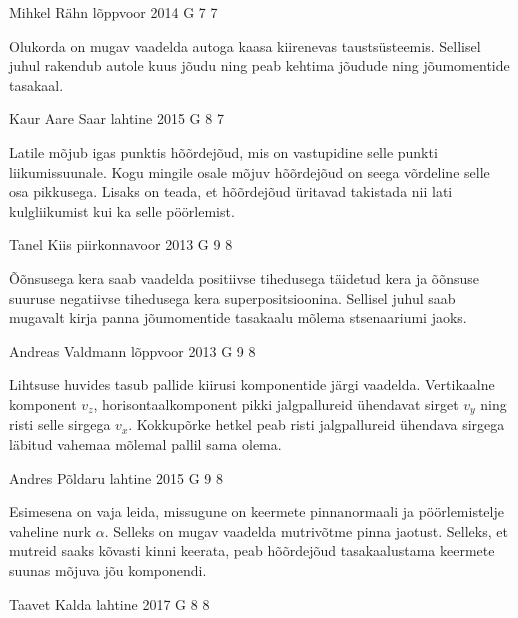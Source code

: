 \documentclass[11pt]{article}
\begin{document}
{%
{Mihkel Rähn} %
{lõppvoor} %
{2014} %
{G 7} %
{7} %
{

\ifHint
Olukorda on mugav vaadelda autoga kaasa kiirenevas taustsüsteemis. Sellisel juhul rakendub autole kuus jõudu ning peab kehtima jõudude ning jõumomentide tasakaal.
\fi
}

{Kaur Aare Saar} %
{lahtine} %
{2015} %
{G 8} %
{7} %
{

\ifHint
Latile mõjub igas punktis hõõrdejõud, mis on vastupidine selle punkti liikumissuunale. Kogu mingile osale mõjuv hõõrdejõud on seega võrdeline selle osa pikkusega. Lisaks on teada, et hõõrdejõud üritavad takistada nii lati kulgliikumist kui ka selle pöörlemist.
\fi
}

{Tanel Kiis} %
{piirkonnavoor} %
{2013} %
{G 9} %
{8} %
{

\ifHint
Õõnsusega kera saab vaadelda positiivse tihedusega täidetud kera ja õõnsuse suuruse negatiivse tihedusega kera superpositsioonina. Sellisel juhul saab mugavalt kirja panna jõumomentide tasakaalu mõlema stsenaariumi jaoks.
\fi
}

{Andreas Valdmann} %
{lõppvoor} %
{2013} %
{G 9} %
{8} %
{

\ifHint
Lihtsuse huvides tasub pallide kiirusi komponentide järgi vaadelda. Vertikaalne komponent $v_z$, horisontaalkomponent pikki jalgpallureid ühendavat sirget $v_y$ ning risti selle sirgega $v_x$. Kokkupõrke hetkel peab risti jalgpallureid ühendava sirgega läbitud vahemaa mõlemal pallil sama olema.
\fi
}

{Andres Põldaru} %
{lahtine} %
{2015} %
{G 9} %
{8} %
{

\ifHint
Esimesena on vaja leida, missugune on keermete pinnanormaali ja pöörlemistelje vaheline nurk $\alpha$. Selleks on mugav vaadelda mutrivõtme pinna jaotust. Selleks, et mutreid saaks kõvasti kinni keerata, peab hõõrdejõud tasakaalustama keermete suunas mõjuva jõu komponendi.
\fi
}

{Taavet Kalda} %
{lahtine} %
{2017} %
{G 8} %
{8} %
{

}}
\end{document}
